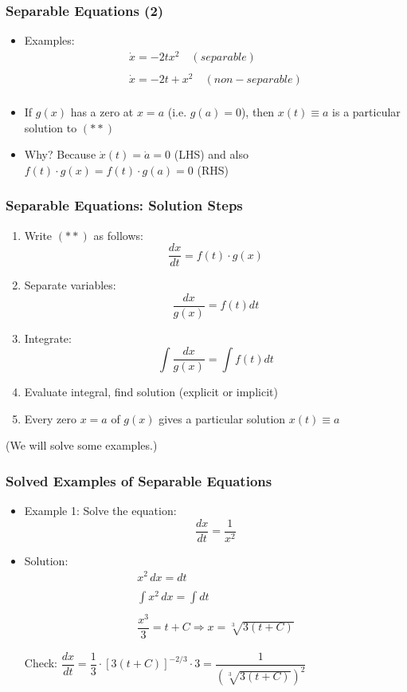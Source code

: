 \documentclass[10pt,usenames,dvipsnames]{beamer}
\theoremstyle{definition}
\begin{document}
\begin{frame}[fragile]
\frametitle{Separable Equations (2)}
\begin{itemize}
	\item Examples:
	\[
		\begin{array}{lcl}
			\dot{x} = -2tx^{2}\quad (separable)\\
			\quad\\
			\dot{x} = -2t + x^{2}\quad (non-separable)\\
		\end{array}
	\]
	\item If $g(x)$ has a zero at $x = a$ (i.e. $g(a) = 0$), then $x(t) \equiv a$ is a particular solution to $(**)$
	\item Why? Because $\dot{x}(t) = \dot{a} = 0$ (LHS) and also $f(t)\cdot g(x) = f(t)\cdot g(a) = 0$ (RHS)
\end{itemize}
\end{frame}

\begin{frame}[fragile]
\frametitle{Separable Equations: Solution Steps}
\begin{enumerate}
	\item Write $(**)$ as follows:
	\[
		\dfrac{dx}{dt} = f(t)\cdot g(x)
	\]
	\item Separate variables:
	\[
		\dfrac{dx}{g(x)} = f(t)dt
	\]
	\item Integrate:
	\[
		\int \dfrac{dx}{g(x)} = \int f(t)dt
	\]
	\item Evaluate integral, find solution (explicit or implicit)
	\item Every zero $x = a$ of $g(x)$ gives a particular solution $x(t) \equiv a$
\end{enumerate}

(We will solve some examples.)
\end{frame}

\begin{frame}[fragile]
	\frametitle{Solved Examples of Separable Equations}
	\begin{itemize}
		\item \textcolor{OliveGreen}{Example 1:} Solve the equation:
		\[
			\dfrac{dx}{dt} = \dfrac{1}{x^{2}}
		\]
		
		\color{red}
		\item Solution:
		\[
			\begin{array}{lcl}
				x^{2}\,dx = dt\\
				\quad\\
				\displaystyle \int x^{2}\,dx = \int dt\\
				\quad\\
				\dfrac{x^{3}}{3} = t + C \Rightarrow x = \sqrt[3]{3(t + C)}
			\end{array}
		\]
		
		Check: $ \dfrac{dx}{dt} = \dfrac{1}{3}\cdot[3(t + C)]^{-2/3}\cdot 3 = \dfrac{1}{\left(\sqrt[3]{3(t + C)}\right)^{2}} $
	\end{itemize}
\end{frame}
\end{document}
